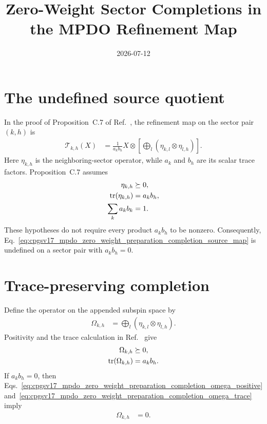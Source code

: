 \documentclass{article}
\title{Zero-Weight Sector Completions in the MPDO Refinement Map}
\author{}
\date{2026-07-12}
\begin{document}
\maketitle
{}

\section{The undefined source quotient}

In the proof of Proposition~C.7 of
Ref.~\cite[Appendix~C.2, lines~1523--1535]{Cirac2016MPDO_arXiv}, the
refinement map on the sector pair $(k,h)$ is
\begin{align}
    \mathcal T_{k,h}(X)
        &=\frac{1}{a_kb_h}X\otimes
        \left[\bigoplus_l
        \left(\eta_{k,l}\otimes\eta_{l,h}\right)\right].
    \label{eq:cpgsv17_mpdo_zero_weight_preparation_completion_source_map}
\end{align}
Here $\eta_{k,h}$ is the neighboring-sector operator, while $a_k$ and $b_h$
are its scalar trace factors. Proposition~C.7 assumes
\begin{align}
    \eta_{k,h}
        &\succeq0,
    \label{eq:cpgsv17_mpdo_zero_weight_preparation_completion_eta_positive}\\
    \operatorname{tr}(\eta_{k,h})
        &=a_kb_h,
    \label{eq:cpgsv17_mpdo_zero_weight_preparation_completion_eta_trace}\\
    \sum_k a_kb_k
        &=1.
    \label{eq:cpgsv17_mpdo_zero_weight_preparation_completion_weight_normalization}
\end{align}
These hypotheses do not require every product $a_kb_h$ to be nonzero.
Consequently,
Eq.~\ref{eq:cpgsv17_mpdo_zero_weight_preparation_completion_source_map} is
undefined on a sector pair with $a_kb_h=0$.

\section{Trace-preserving completion}

Define the operator on the appended subspin space by
\begin{align}
    \Omega_{k,h}
        &=\bigoplus_l
        \left(\eta_{k,l}\otimes\eta_{l,h}\right).
    \label{eq:cpgsv17_mpdo_zero_weight_preparation_completion_omega_definition}
\end{align}
Positivity and the trace calculation in
Ref.~\cite{Cirac2016MPDO_arXiv} give
\begin{align}
    \Omega_{k,h}
        &\succeq0,
    \label{eq:cpgsv17_mpdo_zero_weight_preparation_completion_omega_positive}\\
    \operatorname{tr}(\Omega_{k,h})
        &=a_kb_h.
    \label{eq:cpgsv17_mpdo_zero_weight_preparation_completion_omega_trace}
\end{align}
If $a_kb_h=0$, then
Eqs.~\ref{eq:cpgsv17_mpdo_zero_weight_preparation_completion_omega_positive}
and~\ref{eq:cpgsv17_mpdo_zero_weight_preparation_completion_omega_trace}
imply
\begin{align}
    \Omega_{k,h}
        &=0.
    \label{eq:cpgsv17_mpdo_zero_weight_preparation_completion_zero_omega}
\end{align}
\end{document}
